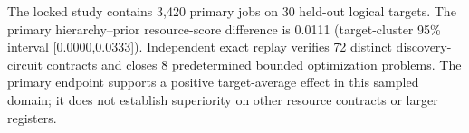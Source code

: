 The locked study contains 3,420 primary jobs on 30 held-out logical targets. The primary hierarchy--prior resource-score difference is 0.0111 (target-cluster 95\% interval [0.0000,0.0333]). Independent exact replay verifies 72 distinct discovery-circuit contracts and closes 8 predetermined bounded optimization problems. The primary endpoint supports a positive target-average effect in this sampled domain; it does not establish superiority on other resource contracts or larger registers.

